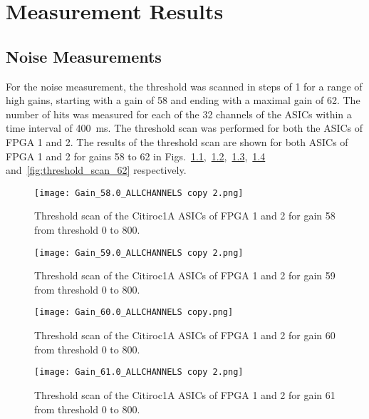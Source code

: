 \chapter{Measurement Results}\label{cha:results}
\noindent
\section{Noise Measurements}
For the noise measurement, the threshold was scanned in steps of 1 for a range of high gains,
starting with a gain of 58 and ending with a maximal gain of 62.
\newline
The number of hits was measured for each of the 32 channels of the ASICs within a time interval of \SI{400}{\milli\second}.
The threshold scan was performed for both the ASICs of FPGA 1 and 2.
\newline
The results of the threshold scan are shown for both ASICs of FPGA 1 and 2 for gains 58 to 62 in Figs.~\ref{fig:threshold_scan_58},~\ref{fig:threshold_scan_59},~\ref{fig:threshold_scan_60},~\ref{fig:threshold_scan_61} and~\ref{fig:threshold_scan_62} respectively.

    \begin{figure}[H]
        \centering
        \texttt{[image: Gain\_58.0\_ALLCHANNELS copy 2.png]}
        \caption{Threshold scan of the Citiroc1A ASICs of FPGA 1 and 2 for gain 58 from threshold 0 to 800.}
        \label{fig:threshold_scan_58}
    \end{figure}
    
    \begin{figure}[H]
        \centering
        \texttt{[image: Gain\_59.0\_ALLCHANNELS copy 2.png]} 
        \caption{Threshold scan of the Citiroc1A ASICs of FPGA 1 and 2 for gain 59 from threshold 0 to 800.}
        \label{fig:threshold_scan_59}
    \end{figure}
    
    \begin{figure}[H]
        \centering
        \texttt{[image: Gain\_60.0\_ALLCHANNELS copy.png]}
        \caption{Threshold scan of the Citiroc1A ASICs of FPGA 1 and 2 for gain 60 from threshold 0 to 800.}
        \label{fig:threshold_scan_60} 
    \end{figure}
    
    \begin{figure}[H]
        \centering
        \texttt{[image: Gain\_61.0\_ALLCHANNELS copy 2.png]}
        \caption{Threshold scan of the Citiroc1A ASICs of FPGA 1 and 2 for gain 61 from threshold 0 to 800.}
        \label{fig:threshold_scan_61}
    \end{figure}
    
